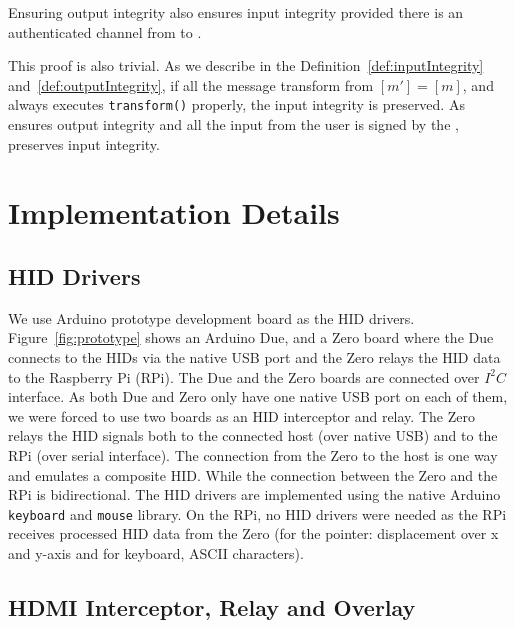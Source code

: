 \begin{theorem}
\label{theorem:th3}
Ensuring output integrity also ensures input integrity provided there is an authenticated channel from \user to \server.
\end{theorem}

\begin{IEEEproof}
This proof is also trivial. As we describe in the Definition~\ref{def:inputIntegrity} and~\ref{def:outputIntegrity}, if all the message transform from \host $[m']=[m]$, and \host always executes \texttt{transform()} properly, the input integrity is preserved. As \name ensures output integrity and all the input from the user is signed by the \device, \name preserves input integrity. 
\end{IEEEproof}


\section*{Implementation Details}
\label{appendix:implementation}

\subsection{HID Drivers}

We use Arduino prototype development board as the HID drivers. Figure~\ref{fig:prototype} shows an Arduino Due, and a Zero board where the Due connects to the HIDs via the native USB port and the Zero relays the HID data to the Raspberry Pi (RPi). The Due and the Zero boards are connected over $I^2C$ interface. As both Due and Zero only have one native USB port on each of them, we were forced to use two boards as an HID interceptor and relay. The Zero relays the HID signals both to the connected host (over native USB) and to the RPi (over serial interface). The connection from the Zero to the host is one way and emulates a composite HID. While the connection between the Zero and the RPi is bidirectional. The HID drivers are implemented using the native Arduino \texttt{keyboard} and \texttt{mouse} library. On the RPi, no HID drivers were needed as the RPi receives processed HID data from the Zero (for the pointer: displacement over x and y-axis and for keyboard, ASCII characters).

\subsection{HDMI Interceptor, Relay and Overlay}

